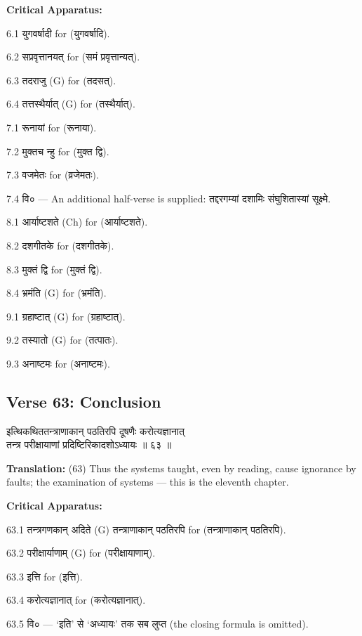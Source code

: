 \documentclass[11pt,a4paper]{article}
\newcommand{\dev}[1]{{\devanagarifont #1}}
\newcommand{\sanskritcol}[1]{%
  \begin{minipage}[t]{0.47\textwidth}
  \vspace{0pt}
  \begin{flushleft}
  #1
  \end{flushleft}
  \end{minipage}%
  \hfill
}
\newcommand{\englishcol}[1]{%
  \begin{minipage}[t]{0.47\textwidth}
  \vspace{0pt}
  \begin{flushleft}
  #1
  \end{flushleft}
  \end{minipage}%
}
\newenvironment{variants}{%
  \small%
  \color{varecolor}%
  \list{}{\leftmargin=2em\itemindent=-1em}%
}{\endlist}
\begin{document}
\vspace{0.4cm}
\textcolor{varecolor}{\textbf{Critical Apparatus:}}
\begin{variants}
\item[6.1] \dev{युगवर्षादी} \dev{for} (\dev{युगवर्षादि}).
\item[6.2] \dev{सप्रवृत्तानयत्} \dev{for} (\dev{समं प्रवृत्तान्यत्}).
\item[6.3] \dev{तदराजु} (G) \dev{for} (\dev{तदसत्}).
\item[6.4] \dev{तत्तस्थैर्यात्} (G) \dev{for} (\dev{तस्थैर्यात्}).
\item[7.1] \dev{रूनायां} \dev{for} (\dev{रूनाया}).
\item[7.2] \dev{मुक्तच न्हु} \dev{for} (\dev{मुक्त द्वि}).
\item[7.3] \dev{वजमेतः} \dev{for} (\dev{व्रजेमतः}).
\item[7.4] \dev{वि०} --- An additional half-verse is supplied:
\dev{तद्दरगम्यां दशामिः संघुशितास्यां सूक्ष्मे}.
\item[8.1] \dev{आर्याष्टशते} (Ch) \dev{for} (\dev{आर्याष्टशते}).
\item[8.2] \dev{दशगीतके} \dev{for} (\dev{दशगीतके}).
\item[8.3] \dev{मुक्तं द्वि} \dev{for} (\dev{मुक्तं द्वि}).
\item[8.4] \dev{भ्रमंति} (G) \dev{for} (\dev{भ्रमंति}).
\item[9.1] \dev{ग्रहाष्टात्} (G) \dev{for} (\dev{ग्रहाष्टात्}).
\item[9.2] \dev{तस्यातो} (G) \dev{for} (\dev{तत्पातः}).
\item[9.3] \dev{अनाष्टमः} \dev{for} (\dev{अनाष्टमः}).
\end{variants}

\subsection*{Verse 63: Conclusion}

\noindent
\sanskritcol{\dev{इत्थिकथिततन्त्राणाकान् पठतिरपि दूषणैः करोत्यज्ञानात्} \\ \dev{तन्त्र परीक्षायाणां प्रदिष्टिरिकादशोऽध्यायः ॥ ६३ ॥}}
\englishcol{\textbf{Translation:} (63) Thus the systems taught, even by reading, cause ignorance
by faults; the examination of systems --- this is the eleventh chapter.}

\vspace{0.4cm}
\textcolor{varecolor}{\textbf{Critical Apparatus:}}
\begin{variants}
\item[63.1] \dev{तन्त्रगणकान् अदिते} (G) \dev{तन्त्राणाकान् पठतिरपि} \dev{for} (\dev{तन्त्राणाकान् पठतिरपि}).
\item[63.2] \dev{परीक्षार्याणाम्} (G) \dev{for} (\dev{परीक्षायाणाम्}).
\item[63.3] \dev{इत्ति} \dev{for} (\dev{इत्ति}).
\item[63.4] \dev{करोत्यज्ञानात्} \dev{for} (\dev{करोत्यज्ञानात्}).
\item[63.5] \dev{वि०} --- \dev{`इति' से `अध्यायः' तक सब लुप्त} (the closing formula is omitted).
\end{variants}
\end{document}
